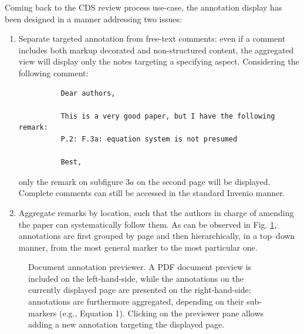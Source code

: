 Coming back to the CDS review process use-case, the annotation display has been
designed in a manner addressing two issues:
\begin{enumerate}
  \item Separate targeted annotation from free-text comments: even if a comment
        includes both markup decorated and non-structured content, the
        aggregated view will display only the notes targeting a specifying
        aspect. Considering the following comment:
        \begin{verbatim}
          Dear authors,

          This is a very good paper, but I have the following remark:
          P.2: F.3a: equation system is not presumed

          Best,
        \end{verbatim}
        only the remark on subfigure $3a$ on the second page will be displayed.
        Complete comments can still be accessed in the standard Invenio
        manner.
  \item Aggregate remarks by location, such that the authors in charge of
        amending the paper can systematically follow them. As can be observed in
        Fig. \ref{fig:noteview}, annotations are first grouped by page and then
        hierarchically, in a top--down manner, from the most general marker to
        the most particular one.
\end{enumerate}

\begin{figure}[!ht]
  \centering
  \caption[Document annotation previewer]
          {Document annotation previewer. A PDF document preview is included on
           the left-hand-side, while the annotations on the currently displayed
           page are presented on the right-hand-side; annotations are
           furthermore aggregated, depending on their sub-markers (e.g.,
           Equation 1). Clicking on the previewer pane allows adding a new
           annotation targeting the displayed page.}
  \label{fig:noteview}
\end{figure}

